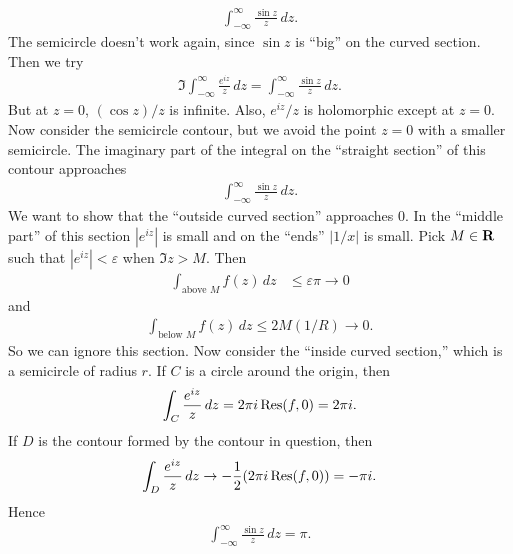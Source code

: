 \documentclass[11pt, oneside,margin=1in]{article}
\begin{document}
\begin{example}[ ]\label{}\text{}
\begin{align*}
	\int_{-\infty}^{\infty} \frac{\sin z}{z}  \, dz. 
\end{align*}
The semicircle doesn't work again, since $\sin z$ is ``big'' on the curved section. Then we try
\begin{align*}
	\Im \int_{-\infty}^{\infty} \frac{e^{iz}}{z}  \, dz =  \int_{-\infty}^{\infty} \frac{\sin z}{z}  \, dz. 
\end{align*}
But at $z=0$, $(\cos z) /z$ is infinite. Also, $e^{iz}/z$ is holomorphic except at $z=0$. Now consider the semicircle contour, but we avoid the point $z=0$ with a smaller semicircle. The imaginary part of the integral on the ``straight section'' of this contour approaches
\begin{align*}
 \int_{-\infty}^{\infty} \frac{\sin z}{z}  \, dz. 
\end{align*}
We want to show that the ``outside curved section'' approaches $0$. In the ``middle part'' of this section $\left\lvert e^{iz} \right\rvert $ is small and on the ``ends'' $\left\lvert 1/x \right\rvert $ is small. Pick $M\in \mathbf R$ such that $\left\lvert e^{iz} \right\rvert <\varepsilon$ when $\Im z > M$. Then
\begin{align*}
	\int_{\textrm{above $M$}}^{} f(z)  \, dz &\le \varepsilon \pi\to 0
\end{align*}
and 
\begin{align*}
	\int_{\textrm{below $M$}}^{} f(z)  \, dz \le 2M(1/R) \to 0. 
\end{align*}
So we can ignore this section. Now consider the ``inside curved section,'' which is a semicircle of radius $r$. If $C$ is a circle around the origin, then
\begin{align*}
	\int_{C}^{} \frac{e^{iz}}{z}  \, dz = 2\pi i \operatorname{Res}(f,0) = 2\pi i. 
\end{align*}
If $D$ is the contour formed by the contour in question, then
\begin{align*}
	\int_{D}^{} \frac{e^{iz}}{z}  \, dz \to -\frac{1}{2} (2\pi i \operatorname{Res}(f,0)) = -\pi i.
\end{align*}
Hence 
\begin{align*}
\int_{-\infty}^{\infty} \frac{\sin z}{z}  \, dz = \pi. 	
\end{align*}
\end{example}
\end{document}
